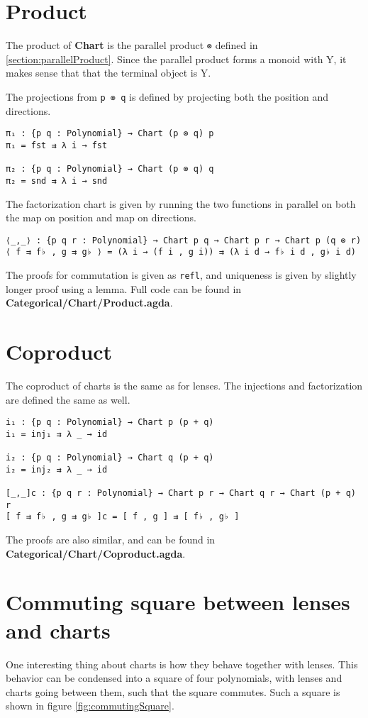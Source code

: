 \section{Product}
The product of \textbf{Chart} is the parallel product \texttt{⊗} defined in \ref{section:parallelProduct}. Since the parallel product forms a monoid with Y, it makes sense that that the terminal object is Y.

The projections from \texttt{p ⊗ q} is defined by projecting both the position and directions.

\begin{verbatim}
π₁ : {p q : Polynomial} → Chart (p ⊗ q) p
π₁ = fst ⇉ λ i → fst

π₂ : {p q : Polynomial} → Chart (p ⊗ q) q
π₂ = snd ⇉ λ i → snd
\end{verbatim}

The factorization chart is given by running the two functions in parallel on both the map on position and map on directions.

\begin{verbatim}
⟨_,_⟩ : {p q r : Polynomial} → Chart p q → Chart p r → Chart p (q ⊗ r)
⟨ f ⇉ f♭ , g ⇉ g♭ ⟩ = (λ i → (f i , g i)) ⇉ (λ i d → f♭ i d , g♭ i d)
\end{verbatim}

The proofs for commutation is given as \texttt{refl}, and uniqueness is given by slightly longer proof using a lemma. Full code can be found in \textbf{Categorical/Chart/Product.agda}.


\section{Coproduct}
The coproduct of charts is the same as for lenses. The injections and factorization are defined the same as well.
\begin{verbatim}
i₁ : {p q : Polynomial} → Chart p (p + q)
i₁ = inj₁ ⇉ λ _ → id

i₂ : {p q : Polynomial} → Chart q (p + q)
i₂ = inj₂ ⇉ λ _ → id

[_,_]c : {p q r : Polynomial} → Chart p r → Chart q r → Chart (p + q) r
[ f ⇉ f♭ , g ⇉ g♭ ]c = [ f , g ] ⇉ [ f♭ , g♭ ]
\end{verbatim}

The proofs are also similar, and can be found in \textbf{Categorical/Chart/Coproduct.agda}.

\section{Commuting square between lenses and charts}
One interesting thing about charts is how they behave together with lenses. This behavior can be condensed into a square of four polynomials, with lenses and charts going between them, such that the square commutes. Such a square is shown in figure \ref{fig:commutingSquare}.


